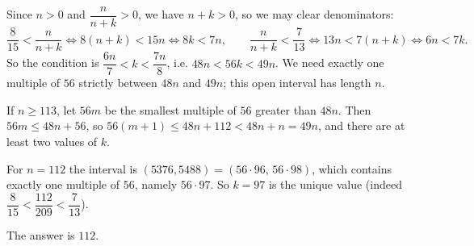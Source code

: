Since $n>0$ and $\dfrac{n}{n+k}>0$, we have $n+k>0$, so we may clear denominators:
\[\dfrac{8}{15}<\dfrac{n}{n+k}\iff 8(n+k)<15n\iff 8k<7n,\qquad \dfrac{n}{n+k}<\dfrac{7}{13}\iff 13n<7(n+k)\iff 6n<7k.\]
So the condition is $\dfrac{6n}{7}<k<\dfrac{7n}{8}$, i.e. $48n<56k<49n$. We need exactly one multiple of $56$ strictly between $48n$ and $49n$; this open interval has length $n$.

If $n\ge113$, let $56m$ be the smallest multiple of $56$ greater than $48n$. Then $56m\le48n+56$, so $56(m+1)\le48n+112<48n+n=49n$, and there are at least two values of $k$.

For $n=112$ the interval is $(5376,5488)=(56\cdot96,\,56\cdot98)$, which contains exactly one multiple of $56$, namely $56\cdot97$. So $k=97$ is the unique value (indeed $\dfrac{8}{15}<\dfrac{112}{209}<\dfrac{7}{13}$).

The answer is $\boxed{112}$.
